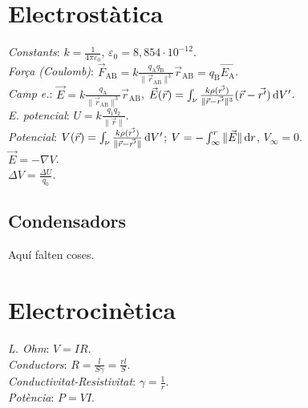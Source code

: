 \section{Electrostàtica}
\emph{Constants}: $k=\frac{1}{4\pi\varepsilon_0}$, $\varepsilon_0=8,854\cdot 10^{-12}$. \\
\emph{Força (Coulomb)}: $\vec{F}_{\text{AB}} = k\frac{q_{\text{A}}q_{\text{B}}}{\|\vec{r}_{\text{AB}}\|^3}\vec{r}_{\text{AB}}=q_\text{B}\vec{E_\text{A}}$. \\
\emph{Camp e.}: $\vec{E} = k\frac{q_\text{A}}{\|\vec{r}_{\text{AB}}\|^3}\vec{r}_{\text{AB}}$, $\vec{E}(\vec{r}) = \int_\nu \frac{k\rho(\vec{r'})}{\|\vec{r}-\vec{r'}\|^3}(\vec{r}-\vec{r'}) \dif V'$. \\
\emph{E. potencial}: $U = k\frac{q_1q_2}{\|\vec{r}\|}$. \\
\emph{Potencial}: $V(\vec{r}) = \int_\nu \frac{k\rho(\vec{r'})}{\|\vec{r}-\vec{r'}\|}\dif V'$; $V=-\int_{\infty}^r \|\vec{E}\| \dif r$, $V_{\infty}=0$. \\
\ci $\vec{E}=-\nabla V$. \\
\ci $\Delta V = \frac{\Delta U}{q_0}$.

\subsection{Condensadors}
Aquí falten coses.


\section{Electrocinètica}
\emph{L. Ohm}: $V=IR$. \\
\emph{Conductors}: $R = \frac{l}{S\gamma} = \frac{rl}{S}$. \\
\emph{Conductivitat-Resistivitat}: $\gamma = \frac{1}{r}$. \\
\emph{Potència}: $P=VI$.
